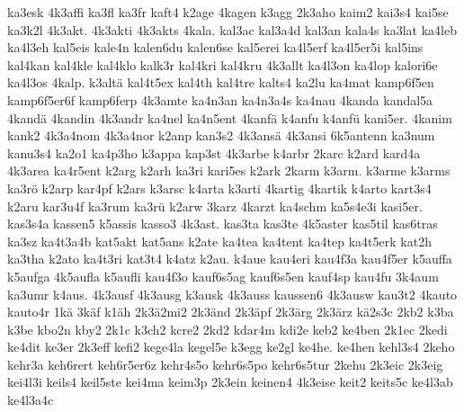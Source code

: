 {    ka3esk
    4k3affi
    ka3fl
    ka3fr
    kaft4
    k2age
    4kagen
    k3agg
    2k3aho
    kaim2
    kai3s4
    kai5se
    ka3k2l
    4k3akt.
    4k3akti
    4k3akts
    4kala.
    kal3ac
    kal3a4d
    kal3an
    kala4s
    ka3lat
    ka4leb
    ka4l3eh
    kal5eis
    kale4n
    kalen6du
    kalen6se
    kal5erei
    ka4l5erf
    ka4l5er5i
    kal5ins
    kal4kan
    kal4kle
    kal4klo
    kalk3r
    kal4kri
    kal4kru
    4k3allt
    ka4l3on
    ka4lop
    kalori6e
    ka4l3os
    4kalp.
    k3altä
    kal4t5ex
    kal4th
    kal4tre
    kalts4
    ka2lu
    ka4mat
    kamp6f5en
    kamp6f5er6f
    kamp6ferp
    4k3amte
    ka4n3an
    ka4n3a4s
    ka4nau
    4kanda
    kandal5a
    4kandä
    4kandin
    4k3andr
    ka4nel
    ka4n5ent
    4kanfä
    k4anfu
    k4anfü
    kani5er.
    4kanim
    kank2
    4k3a4nom
    4k3a4nor
    k2anp
    kan3s2
    4k3ansä
    4k3ansi
    6k5antenn
    ka3num
    kanu3s4
    ka2o1
    ka4p3ho
    k3appa
    kap3st
    4k3arbe
    k4arbr
    2karc
    k2ard
    kard4a
    4k3area
    ka4r5ent
    k2arg
    k2arh
    ka3ri
    kari5es
    k2ark
    2karm
    k3arm.
    k3arme
    k3arms
    ka3rö
    k2arp
    kar4pf
    k2ars
    k3arsc
    k4arta
    k3arti
    4kartig
    4kartik
    k4arto
    kart3s4
    k2aru
    kar3u4f
    ka3rum
    ka3rü
    k2arw
    3karz
    4karzt
    ka4schm
    ka5s4e3i
    kasi5er.
    kas3s4a
    kassen5
    k5assis
    kasso3
    4k3ast.
    kas3ta
    kas3te
    4k5aster
    kas5til
    kas6tras
    ka3sz
    ka4t3a4b
    kat5akt
    kat5ans
    k2ate
    ka4tea
    ka4tent
    ka4tep
    ka4t5erk
    kat2h
    ka3tha
    k2ato
    ka4t3ri
    kat3t4
    k4atz
    k2au.
    k4aue
    kau4eri
    kau4f3a
    kau4f5er
    k5auffa
    k5aufga
    4k5aufla
    k5aufli
    kau4f3o
    kauf6s5ag
    kauf6s5en
    kauf4sp
    kau4fu
    3k4aum
    ka3umr
    k4aus.
    4k3ausf
    4k3ausg
    k3ausk
    4k3auss
    kaussen6
    4k3ausw
    kau3t2
    4kauto
    kauto4r
    1kä
    3käf
    k1äh
    2k3ä2mi2
    2k3änd
    2k3äpf
    2k3ärg
    2k3ärz
    kä2s3c
    2kb2
    k3ba
    k3be
    kbo2n
    kby2
    2k1c
    k3ch2
    kcre2
    2kd2
    kdar4m
    kdi2e
    keb2
    ke4ben
    2k1ec
    2kedi
    ke4dit
    ke3er
    2k3eff
    kefi2
    kege4la
    kegel5e
    k3egg
    ke2gl
    ke4he.
    ke4hen
    kehl3s4
    2keho
    kehr3a
    keh6rert
    keh6r5er6z
    kehr4s5o
    kehr6s5po
    kehr6s5tur
    2kehu
    2k3eic
    2k3eig
    kei4l3i
    keils4
    keil5ste
    kei4ma
    keim3p
    2k3ein
    keinen4
    4k3eise
    keit2
    keits5c
    ke4l3ab
    ke4l3a4c
}
